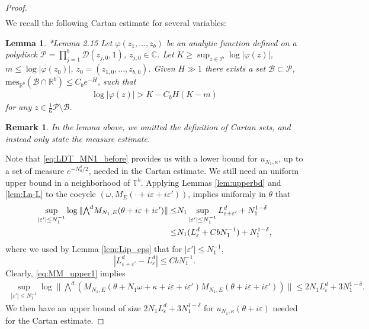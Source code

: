\documentclass[11pt]{amsart}
\newtheorem{lemma}[theorem]{Lemma}
\newtheorem{remark}[theorem]{Remark}
\newcommand{\R}{\mathbb R}
\newcommand{\C}{\mathbb C}
\newcommand{\T}{\mathbb T}
\begin{document}
\begin{proof}
\begin{align}
\end{align}
We recall the following Cartan estimate for several variables:
\begin{lemma}\label{lem:Cartan}\cite{GS2}*{Lemma 2.15}
Let $\varphi(z_1,...,z_b)$ be an analytic function defined on a polydisck $\mathcal{P}=\prod_{j=1}^b \mathcal{D}(z_{j,0},1)$, $z_{j,0}\in \C$. Let $K\geq \sup_{z\in \mathcal{P}}\log |\varphi(z)|$, $m\leq \log |\varphi(z_0)|$, $z_0=(z_{1,0},...,z_{b,0})$. Given $H\gg 1$ there exists a set $\mathcal{B}\subset \mathcal{P}$, $\mathrm{mes}_{\R^b}(\mathcal{B}\cap \R^b)\leq C_b e^{-H}$, such that 
\begin{align}
    \log |\varphi(z)|>K-C_b H(K-m)
\end{align}
for any $z\in \frac{1}{6}\mathcal{P}\setminus \mathcal{B}$. 
\end{lemma}
\begin{remark}
    In the lemma above, we omitted the definition of Cartan sets, and instead only state the measure estimate.
\end{remark}
Note that \eqref{eq:LDT_MN1_before} provides us with a lower bound for $u_{N_1,\kappa}$, up to a set of measure $e^{-N_0^{\delta}/2}$, needed in the Cartan estimate. We still need an uniform upper bound in a neighborhood of $\T^b$.
Applying Lemmas \ref{lem:upperbd} and \ref{lem:Ln-L} to the cocycle $(\omega, M_E(\cdot+i\varepsilon+i\varepsilon'))$, implies uniformly in $\theta$ that
\begin{align}\label{eq:MM_upper1}
    \sup_{|\varepsilon'|\leq N_1^{-1}}\log \|\textstyle{\bigwedge}^d M_{N_1,E}(\theta+i\varepsilon+i\varepsilon')\|
    \leq &N_1 \sup_{|\varepsilon'|\leq N_1^{-1}} L^d_{\varepsilon+\varepsilon'}+N_1^{1-\delta}\notag\\
    \leq &N_1 (L^d_{\varepsilon}+Cb N_1^{-1})+N_1^{1-\delta},
\end{align}
where we used by Lemma \ref{lem:Lip_eps} that for $|\varepsilon'|\leq N_1^{-1}$, 
\[|L^d_{\varepsilon+\varepsilon'}-L^d_{\varepsilon}|\leq CbN_1^{-1}.\]
Clearly, \eqref{eq:MM_upper1} implies
\begin{align}\label{eq:MM_upper2}
    \sup_{|\varepsilon'|\leq N_1^{-1}}\log \|\textstyle{\bigwedge}^d \left(M_{N_1,E}(\theta+N_1\omega+\kappa+i\varepsilon+i\varepsilon') M_{N_1,E}(\theta+i\varepsilon+i\varepsilon')\right)\|
    \leq 2N_1 L^d_{\varepsilon}+3N_1^{1-\delta}.
\end{align}
We then have an upper bound of size $2N_1L^d_{\varepsilon}+3N_1^{1-\delta}$ for $u_{N_1,\kappa}(\theta+i\varepsilon)$ needed for the Cartan estimate.

\end{proof}
\end{document}
